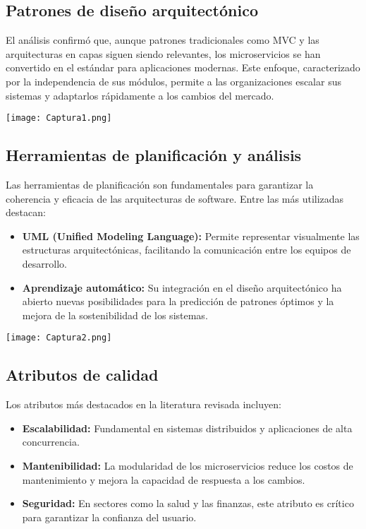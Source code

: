 \documentclass[12pt,a4paper]{article}
\begin{document}
\begin{multicols}{2}
\subsection*{Patrones de diseño arquitectónico}
El análisis confirmó que, aunque patrones tradicionales como MVC y las arquitecturas en capas siguen siendo relevantes, los microservicios se han convertido en el estándar para aplicaciones modernas. Este enfoque, caracterizado por la independencia de sus módulos, permite a las organizaciones escalar sus sistemas y adaptarlos rápidamente a los cambios del mercado.

\texttt{[image: Captura1.png]}

\subsection*{Herramientas de planificación y análisis}
Las herramientas de planificación son fundamentales para garantizar la coherencia y eficacia de las arquitecturas de software. Entre las más utilizadas destacan:
\begin{itemize}
    \item \textbf{UML (Unified Modeling Language):} Permite representar visualmente las estructuras arquitectónicas, facilitando la comunicación entre los equipos de desarrollo.
    \item \textbf{Aprendizaje automático:} Su integración en el diseño arquitectónico ha abierto nuevas posibilidades para la predicción de patrones óptimos y la mejora de la sostenibilidad de los sistemas.
\end{itemize}

\texttt{[image: Captura2.png]}

\subsection*{Atributos de calidad}
Los atributos más destacados en la literatura revisada incluyen:
\begin{itemize}
    \item \textbf{Escalabilidad:} Fundamental en sistemas distribuidos y aplicaciones de alta concurrencia.
    \item \textbf{Mantenibilidad:} La modularidad de los microservicios reduce los costos de mantenimiento y mejora la capacidad de respuesta a los cambios.
    \item \textbf{Seguridad:} En sectores como la salud y las finanzas, este atributo es crítico para garantizar la confianza del usuario.
\end{itemize}


\end{multicols}
\end{document}
